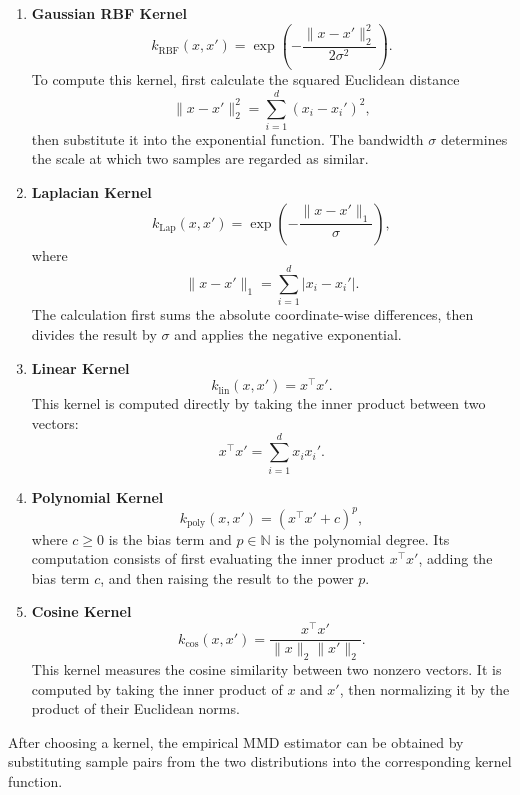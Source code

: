 \documentclass{article}
\theoremstyle{plain}
\theoremstyle{definition}
\theoremstyle{remark}
\begin{document}
\begin{enumerate}
    \item \textbf{Gaussian RBF Kernel}
    \[
        k_{\mathrm{RBF}}(x,x') =
        \exp\left(-\frac{\|x-x'\|_2^2}{2\sigma^2}\right).
    \]
    To compute this kernel, first calculate the squared Euclidean distance
    \[
        \|x-x'\|_2^2 = \sum_{i=1}^d (x_i-x_i')^2,
    \]
    then substitute it into the exponential function. The bandwidth $\sigma$ determines the scale at which two samples are regarded as similar.

    \item \textbf{Laplacian Kernel}
    \[
        k_{\mathrm{Lap}}(x,x') =
        \exp\left(-\frac{\|x-x'\|_1}{\sigma}\right),
    \]
    where
    \[
        \|x-x'\|_1 = \sum_{i=1}^d |x_i-x_i'|.
    \]
    The calculation first sums the absolute coordinate-wise differences, then divides the result by $\sigma$ and applies the negative exponential.

    \item \textbf{Linear Kernel}
    \[
        k_{\mathrm{lin}}(x,x') = x^\top x'.
    \]
    This kernel is computed directly by taking the inner product between two vectors:
    \[
        x^\top x' = \sum_{i=1}^d x_i x_i'.
    \]

    \item \textbf{Polynomial Kernel}
    \[
        k_{\mathrm{poly}}(x,x') = (x^\top x' + c)^p,
    \]
    where $c \geq 0$ is the bias term and $p \in \mathbb{N}$ is the polynomial degree. Its computation consists of first evaluating the inner product $x^\top x'$, adding the bias term $c$, and then raising the result to the power $p$.

    \item \textbf{Cosine Kernel}
    \[
        k_{\mathrm{cos}}(x,x') =
        \frac{x^\top x'}{\|x\|_2 \|x'\|_2}.
    \]
    This kernel measures the cosine similarity between two nonzero vectors. It is computed by taking the inner product of $x$ and $x'$, then normalizing it by the product of their Euclidean norms.
\end{enumerate}

After choosing a kernel, the empirical MMD estimator can be obtained by substituting sample pairs from the two distributions into the corresponding kernel function.
\newpage
\end{document}
